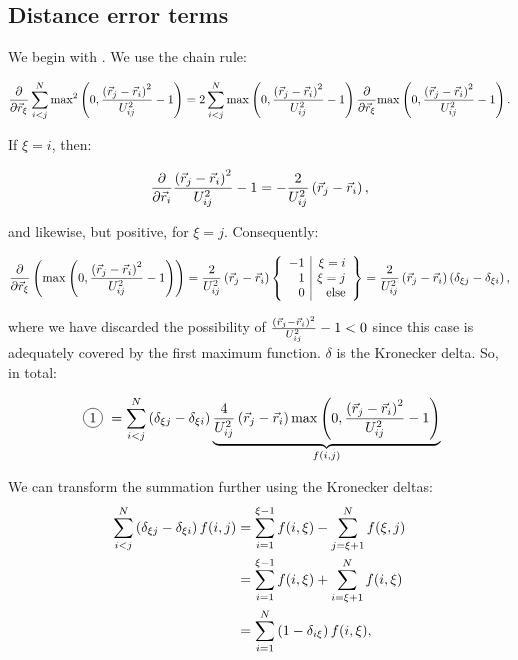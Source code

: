 \documentclass[a4paper]{article}
\newcommand*\circled[1]{
  \tikz[baseline=(char.base)]{
    \node[shape=circle,draw,inner sep=2pt] (char) {#1};
  }
}
\begin{document}
\subsection{Distance error terms}

We begin with \circled{1}. We use the chain rule:

\begin{equation}
  \frac{\partial}{\partial\vec{r}_{\xi}} \sum_{i < j}^{N} \textrm{max}^{2}\left(0, \frac{\left(\vec{r}_{j}-\vec{r}_{i}\right)^{2}}{U_{ij}^{2}}-1\right)
  = 2 \sum_{i < j}^{N} \textrm{max}^{}\left(0, \frac{\left(\vec{r}_{j}-\vec{r}_{i}\right)^{2}}{U_{ij}^{2}}-1\right) \frac{\partial}{\partial\vec{r}_{\xi}}
  \textrm{max}^{}\left(0, \frac{\left(\vec{r}_{j}-\vec{r}_{i}\right)^{2}}{U_{ij}^{2}}-1\right).
\end{equation}

If $\xi = i$, then:

\begin{equation}
  \frac{\partial}{\partial\vec{r}_{i}} \frac{\left(\vec{r}_{j}-\vec{r}_{i}\right)^{2}}{U_{ij}^{2}}-1
  = - \frac{2}{U_{ij}^{2}} \left(\vec{r}_{j}-\vec{r}_{i}\right),
\end{equation}

and likewise, but positive, for $\xi = j$. Consequently:

\begin{equation}
  \frac{\partial}{\partial\vec{r}_{\xi}} \left( \textrm{max}^{}\left(0, \frac{\left(\vec{r}_{j}-\vec{r}_{i}\right)^{2}}{U_{ij}^{2}}-1\right) \right)
  = \frac{2}{U_{ij}^{2}} \left(\vec{r}_{j}-\vec{r}_{i}\right) \left\{ \begin{array}{r | r}
    -1 & \xi = i\\
    1 & \xi = j\\
    0 & \textrm{else}
  \end{array} \right\}
  = \frac{2}{U_{ij}^{2}} \left(\vec{r}_{j}-\vec{r}_{i}\right) \left(\delta_{\xi j}-\delta_{\xi i} 
  \right),
\end{equation}

where we have discarded the possibility of $\frac{\left(\vec{r}_{j}-\vec{r}_{i}\right)^{2}}{U_{ij}^{2}}-1 < 0$
since this case is adequately covered by the first maximum function. $\delta$ is
the Kronecker delta. So, in total:

\begin{equation}\label{eq_breakdown_deltas}
  \text{\circled{1}}
  = \ijNSum \left(
    \delta_{\xi j} - \delta_{\xi i} 
  \right) \underbrace{\frac{4}{U_{ij}^{2}} 
    \posVecDiff{j}{i} \distanceErrorFirstTerm{}
  }_{f(i, j)}
\end{equation}

We can transform the summation further using the Kronecker deltas:
\begin{align}
  \sum_{i < j}^{N} \left( \delta_{\xi j} - \delta_{\xi i} \right) f(i, j)
  &= \sum_{i = 1}^{\xi - 1} f(i, \xi) 
    - \sum_{j = \xi + 1}^{N} f(\xi, j)\\
  &= \sum_{i = 1}^{\xi - 1} f(i, \xi) 
    + \sum_{i = \xi + 1}^{N} f(i, \xi)\\
  &= \sum_{i = 1}^{N} \left(1 - \delta_{i\xi} \right) f(i, \xi),
\end{align}
\end{document}
